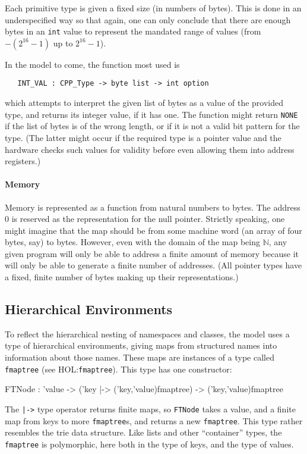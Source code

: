 \documentclass[11pt]{article}
\newcommand{\HOLfile}[1]{HOL:\texttt{#1}}
\begin{document}
Each primitive type is given a fixed size (in numbers of bytes).  This
is done in an underspecified way so that again, one can only conclude
that there are enough bytes in an \texttt{int} value to represent the
mandated range of values (from $-(2^{16} - 1)$ up to $2^{16} - 1$).

In the model to come, the function most used is
\begin{verbatim}
   INT_VAL : CPP_Type -> byte list -> int option
\end{verbatim}
which attempts to interpret the given list of bytes as a value of the
provided type, and returns its integer value, if it has one.  The
function might return \texttt{NONE} if the list of bytes is of the
wrong length, or if it is not a valid bit pattern for the type.  (The
latter might occur if the required type is a pointer value and the
hardware checks such values for validity before even allowing them
into address registers.)

\paragraph{Memory}
Memory is represented as a function from natural numbers to bytes.
The address 0 is reserved as the representation for the null pointer.
Strictly speaking, one might imagine that the map should be from some
machine word (an array of four bytes, say) to bytes.  However, even
with the domain of the map being $\mathbb{N}$, any given program will
only be able to address a finite amount of memory because it will only
be able to generate a finite number of addresses.  (All pointer types
have a fixed, finite number of bytes making up their representations.)

\subsection{Hierarchical Environments}
\label{sec:hierarchical-environments}

To reflect the hierarchical nesting of namespaces and classes, the
model uses a type of hierarchical environments, giving maps from
structured names into information about those names.  These maps are
instances of a type called \texttt{fmaptree} (see \HOLfile{fmaptree}).
This type has one constructor:
\begin{stdrule}
   FTNode : 'value -> ('key |-> ('key,'value)fmaptree) ->
            ('key,'value)fmaptree
\end{stdrule}
The \texttt{|->} type operator returns finite maps, so \texttt{FTNode}
takes a value, and a finite map from keys to more \texttt{fmaptree}s,
and returns a new \texttt{fmaptree}.  This type rather resembles the
trie data structure.  Like lists and other ``container'' types, the
\texttt{fmaptree} is polymorphic, here both in the type of keys, and
the type of values.
\end{document}
